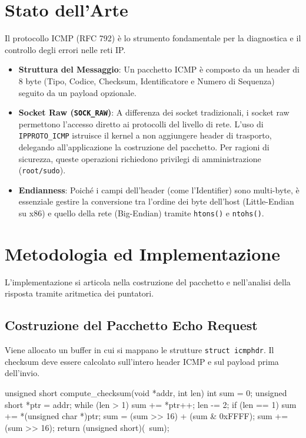 \documentclass[a4paper,12pt]{article}
\begin{document}
\section{Stato dell'Arte}
Il protocollo ICMP (RFC 792) è lo strumento fondamentale per la diagnostica e il controllo degli errori nelle reti IP.
\begin{itemize}
    \item \textbf{Struttura del Messaggio}: Un pacchetto ICMP è composto da un header di 8 byte (Tipo, Codice, Checksum, Identificatore e Numero di Sequenza) seguito da un payload opzionale.
    \item \textbf{Socket Raw (\texttt{SOCK_RAW})}: A differenza dei socket tradizionali, i socket raw permettono l'accesso diretto ai protocolli del livello di rete. L'uso di \texttt{IPPROTO_ICMP} istruisce il kernel a non aggiungere header di trasporto, delegando all'applicazione la costruzione del pacchetto. Per ragioni di sicurezza, queste operazioni richiedono privilegi di amministrazione (\texttt{root/sudo}).
    \item \textbf{Endianness}: Poiché i campi dell'header (come l'Identifier) sono multi-byte, è essenziale gestire la conversione tra l'ordine dei byte dell'host (Little-Endian su x86) e quello della rete (Big-Endian) tramite \texttt{htons()} e \texttt{ntohs()}.
\end{itemize}

\section{Metodologia ed Implementazione}
L'implementazione si articola nella costruzione del pacchetto e nell'analisi della risposta tramite aritmetica dei puntatori.

\subsection{Costruzione del Pacchetto Echo Request}
Viene allocato un buffer in cui si mappano le strutture \texttt{struct icmphdr}. Il checksum deve essere calcolato sull'intero header ICMP e sul payload prima dell'invio.
\begin{ccode}
unsigned short compute_checksum(void *addr, int len) {
    int sum = 0; unsigned short *ptr = addr;
    while (len > 1) { sum += *ptr++; len -= 2; }
    if (len == 1) sum += *(unsigned char *)ptr;
    sum = (sum >> 16) + (sum & 0xFFFF);
    sum += (sum >> 16);
    return (unsigned short)(~sum);
}
\end{ccode}
\end{document}
